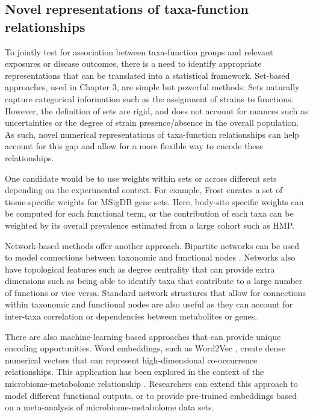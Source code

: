 \subsection{Novel representations of taxa-function relationships}

To jointly test for association between taxa-function groups and relevant exposures or disease outcomes, there is a need to identify appropriate representations that can be translated into a statistical framework. Set-based approaches, used in Chapter 3, are simple but powerful methods. Sets naturally capture categorical information such as the assignment of strains to functions. However, the definition of sets are rigid, and does not account for nuances such as uncertainties or the degree of strain presence/absence in the overall population. As such, novel numerical representations of taxa-function relationships can help account for this gap and allow for a more flexible way to encode these relationships. 

One candidate would be to use weights within sets or across different sets depending on the experimental context. For example, Frost \cite{frost2018computation} curates a set of tissue-specific weights for MSigDB gene sets. Here, body-site specific weights can be computed for each functional term, or the contribution of each taxa can be weighted by its overall prevalence estimated from a large cohort such as HMP.  

Network-based methods offer another approach. Bipartite networks can be used to model connections between taxonomic and functional nodes \cite{tian2020decipheringa}. Networks also have topological features such as degree centrality that can provide extra dimensions such as being able to identify taxa that contribute to a large number of functions or vice versa. Standard network structures that allow for connections within taxonomic and functional nodes are also useful as they can account for inter-taxa correlation or dependencies between metabolites or genes. 

There are also machine-learning based approaches that can provide unique encoding opportunities. Word embeddings, such as Word2Vec \cite{mikolov2013efficient}, create dense numerical vectors that can represent high-dimensional co-occurrence relationships. This application has been explored in the context of the microbiome-metabolome relationship \cite{morton2019learning}. Researchers can extend this approach to model different functional outputs, or to provide pre-trained embeddings based on a meta-analysis of microbiome-metabolome data sets.  
